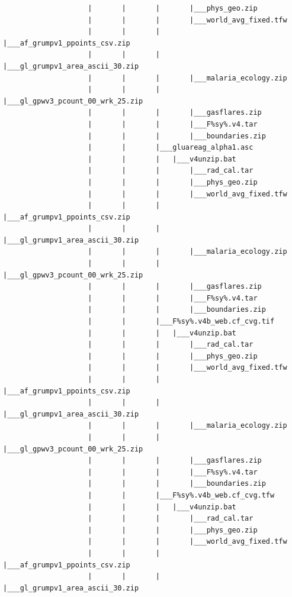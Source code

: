 \documentclass[
]{book}
\begin{document}
\begin{verbatim}
                    |       |       |       |___phys_geo.zip
                    |       |       |       |___world_avg_fixed.tfw
                    |       |       |       |___af_grumpv1_ppoints_csv.zip
                    |       |       |       |___gl_grumpv1_area_ascii_30.zip
                    |       |       |       |___malaria_ecology.zip
                    |       |       |       |___gl_gpwv3_pcount_00_wrk_25.zip
                    |       |       |       |___gasflares.zip
                    |       |       |       |___F%sy%.v4.tar
                    |       |       |       |___boundaries.zip
                    |       |       |___gluareag_alpha1.asc
                    |       |       |   |___v4unzip.bat
                    |       |       |       |___rad_cal.tar
                    |       |       |       |___phys_geo.zip
                    |       |       |       |___world_avg_fixed.tfw
                    |       |       |       |___af_grumpv1_ppoints_csv.zip
                    |       |       |       |___gl_grumpv1_area_ascii_30.zip
                    |       |       |       |___malaria_ecology.zip
                    |       |       |       |___gl_gpwv3_pcount_00_wrk_25.zip
                    |       |       |       |___gasflares.zip
                    |       |       |       |___F%sy%.v4.tar
                    |       |       |       |___boundaries.zip
                    |       |       |___F%sy%.v4b_web.cf_cvg.tif
                    |       |       |   |___v4unzip.bat
                    |       |       |       |___rad_cal.tar
                    |       |       |       |___phys_geo.zip
                    |       |       |       |___world_avg_fixed.tfw
                    |       |       |       |___af_grumpv1_ppoints_csv.zip
                    |       |       |       |___gl_grumpv1_area_ascii_30.zip
                    |       |       |       |___malaria_ecology.zip
                    |       |       |       |___gl_gpwv3_pcount_00_wrk_25.zip
                    |       |       |       |___gasflares.zip
                    |       |       |       |___F%sy%.v4.tar
                    |       |       |       |___boundaries.zip
                    |       |       |___F%sy%.v4b_web.cf_cvg.tfw
                    |       |       |   |___v4unzip.bat
                    |       |       |       |___rad_cal.tar
                    |       |       |       |___phys_geo.zip
                    |       |       |       |___world_avg_fixed.tfw
                    |       |       |       |___af_grumpv1_ppoints_csv.zip
                    |       |       |       |___gl_grumpv1_area_ascii_30.zip

\end{verbatim}
\end{document}
